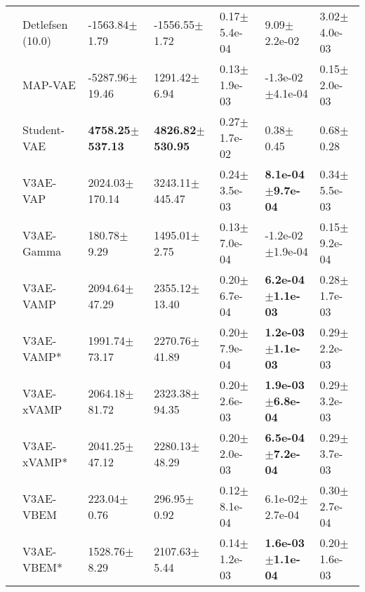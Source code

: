 \begin{tabular}{lllllll}
      & Detlefsen (10.0) &            -1563.84$\pm$1.79 &            -1556.55$\pm$1.72 &              0.17$\pm$5.4e-04 &               9.09$\pm$2.2e-02 &              3.02$\pm$4.0e-03 \\
      & MAP-VAE &           -5287.96$\pm$19.46 &             1291.42$\pm$6.94 &              0.13$\pm$1.9e-03 &           -1.3e-02$\pm$4.1e-04 &              0.15$\pm$2.0e-03 \\
      & Student-VAE &  \textbf{4758.25$\pm$537.13} &  \textbf{4826.82$\pm$530.95} &              0.27$\pm$1.7e-02 &                  0.38$\pm$0.45 &                 0.68$\pm$0.28 \\
      & V3AE-VAP &           2024.03$\pm$170.14 &           3243.11$\pm$445.47 &              0.24$\pm$3.5e-03 &   \textbf{8.1e-04$\pm$9.7e-04} &              0.34$\pm$5.5e-03 \\
      & V3AE-Gamma &              180.78$\pm$9.29 &             1495.01$\pm$2.75 &              0.13$\pm$7.0e-04 &           -1.2e-02$\pm$1.9e-04 &              0.15$\pm$9.2e-04 \\
      & V3AE-VAMP &            2094.64$\pm$47.29 &            2355.12$\pm$13.40 &              0.20$\pm$6.7e-04 &   \textbf{6.2e-04$\pm$1.1e-03} &              0.28$\pm$1.7e-03 \\
      & V3AE-VAMP* &            1991.74$\pm$73.17 &            2270.76$\pm$41.89 &              0.20$\pm$7.9e-04 &   \textbf{1.2e-03$\pm$1.1e-03} &              0.29$\pm$2.2e-03 \\
      & V3AE-xVAMP &            2064.18$\pm$81.72 &            2323.38$\pm$94.35 &              0.20$\pm$2.6e-03 &   \textbf{1.9e-03$\pm$6.8e-04} &              0.29$\pm$3.2e-03 \\
      & V3AE-xVAMP* &            2041.25$\pm$47.12 &            2280.13$\pm$48.29 &              0.20$\pm$2.0e-03 &   \textbf{6.5e-04$\pm$7.2e-04} &              0.29$\pm$3.7e-03 \\
      & V3AE-VBEM &              223.04$\pm$0.76 &              296.95$\pm$0.92 &              0.12$\pm$8.1e-04 &            6.1e-02$\pm$2.7e-04 &              0.30$\pm$2.7e-04 \\
      & V3AE-VBEM* &             1528.76$\pm$8.29 &             2107.63$\pm$5.44 &              0.14$\pm$1.2e-03 &   \textbf{1.6e-03$\pm$1.1e-04} &              0.20$\pm$1.6e-03 \\
\bottomrule
\end{tabular}

